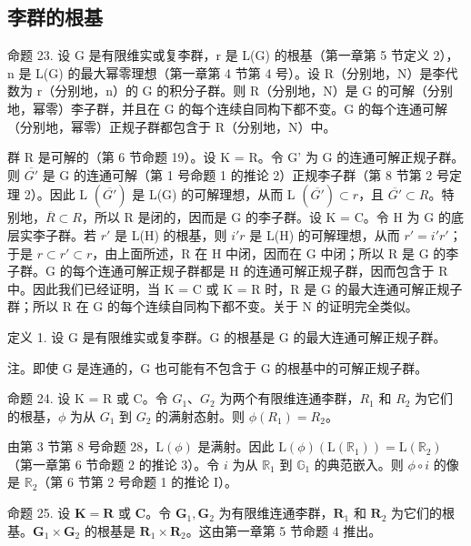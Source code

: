 \subsection{李群的根基}

命题 23. 设 G 是有限维实或复李群，r 是 L(G) 的根基（第一章第 5 节定义 2），n 是 L(G) 的最大幂零理想（第一章第 4 节第 4 号）。设 R（分别地，N）是李代数为 r（分别地，n）的 G 的积分子群。则 R（分别地，N）是 G 的可解（分别地，幂零）李子群，并且在 G 的每个连续自同构下都不变。G 的每个连通可解（分别地，幂零）正规子群都包含于 R（分别地，N）中。

群 R 是可解的（第 6 节命题 19）。设 K = R。令 G' 为 G 的连通可解正规子群。则 \(\overline{G'}\) 是 G 的连通可解（第 1 号命题 1 的推论 2）正规李子群（第 8 节第 2 号定理 2）。因此 L \((\overline{G'})\) 是 L(G) 的可解理想，从而 L \((\overline{G'}) \subset r\)，且 \(\overline{G'} \subset R\)。特别地，\(\overline{R} \subset R\)，所以 R 是闭的，因而是 G 的李子群。设 K = C。令 H 为 G 的底层实李子群。若 \(r'\) 是 L(H) 的根基，则 \(i'r\) 是 L(H) 的可解理想，从而 \(r' = i'r'\)；于是 \(r \subset r' \subset r\)，由上面所述，R 在 H 中闭，因而在 G 中闭；所以 R 是 G 的李子群。G 的每个连通可解正规子群都是 H 的连通可解正规子群，因而包含于 R 中。因此我们已经证明，当 K = C 或 K = R 时，R 是 G 的最大连通可解正规子群；所以 R 在 G 的每个连续自同构下都不变。关于 N 的证明完全类似。

定义 1. 设 G 是有限维实或复李群。G 的根基是 G 的最大连通可解正规子群。

注。即使 G 是连通的，G 也可能有不包含于 G 的根基中的可解正规子群。

命题 24. 设 K = R 或 C。令 \(G_{1}\)、\(G_{2}\) 为两个有限维连通李群，\(R_{1}\) 和 \(R_{2}\) 为它们的根基，\(\phi\) 为从 \(G_{1}\) 到 \(G_{2}\) 的满射态射。则 \(\phi(R_{1}) = R_{2}\)。

由第 3 节第 8 号命题 28，\(\mathrm{L}(\phi)\) 是满射。因此 \(\mathrm{L}(\phi)(\mathrm{L}(\mathbb{R}_1)) = \mathrm{L}(\mathbb{R}_2)\)（第一章第 6 节命题 2 的推论 3）。令 \(i\) 为从 \(\mathbb{R}_1\) 到 \(\mathbb{G}_1\) 的典范嵌入。则 \(\phi \circ i\) 的像是 \(\mathbb{R}_2\)（第 6 节第 2 号命题 1 的推论 I）。

命题 25. 设 \(\mathbf{K} = \mathbf{R}\) 或 \(\mathbf{C}\)。令 \(\mathbf{G}_1, \mathbf{G}_2\) 为有限维连通李群，\(\mathbf{R}_1\) 和 \(\mathbf{R}_2\) 为它们的根基。\(\mathbf{G}_1 \times \mathbf{G}_2\) 的根基是 \(\mathbf{R}_1 \times \mathbf{R}_2\)。这由第一章第 5 节命题 4 推出。


